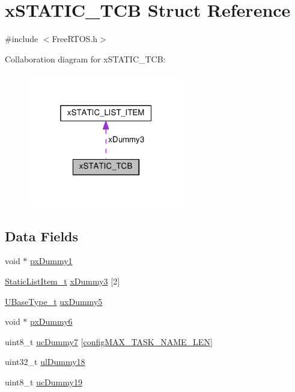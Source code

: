 \hypertarget{structxSTATIC__TCB}{}\section{x\+S\+T\+A\+T\+I\+C\+\_\+\+T\+CB Struct Reference}
\label{structxSTATIC__TCB}


{\ttfamily \#include $<$Free\+R\+T\+O\+S.\+h$>$}



Collaboration diagram for x\+S\+T\+A\+T\+I\+C\+\_\+\+T\+CB\+:\nopagebreak
\begin{figure}[H]
\begin{center}
\leavevmode
\includegraphics[width=193pt]{d1/d99/structxSTATIC__TCB__coll__graph}
\end{center}
\end{figure}
\subsection*{Data Fields}
\begin{DoxyCompactItemize}
\item 
void $\ast$ \hyperlink{structxSTATIC__TCB_a2f66b620fdeb13f8969f27e1bbb4d1d1}{px\+Dummy1}
\item 
\hyperlink{FreeRTOS_8h_a1d31bc0472385a87424518da484d9e09}{Static\+List\+Item\+\_\+t} \hyperlink{structxSTATIC__TCB_a7f182aa8f5003494f63d975dabcb3ec1}{x\+Dummy3} \mbox{[}2\mbox{]}
\item 
\hyperlink{portmacro_8h_a646f89d4298e4f5afd522202b11cb2e6}{U\+Base\+Type\+\_\+t} \hyperlink{structxSTATIC__TCB_ab950bb498901ef7291e49086e5a2efd0}{ux\+Dummy5}
\item 
void $\ast$ \hyperlink{structxSTATIC__TCB_a416495e152e5caef64994f72329c60b0}{px\+Dummy6}
\item 
uint8\+\_\+t \hyperlink{structxSTATIC__TCB_a308771ccd6723cad777695d84a0a2a30}{uc\+Dummy7} \mbox{[}\hyperlink{FreeRTOS_8h_ac388dc4041aab6997348828eb27fc1a8}{config\+M\+A\+X\+\_\+\+T\+A\+S\+K\+\_\+\+N\+A\+M\+E\+\_\+\+L\+EN}\mbox{]}
\item 
uint32\+\_\+t \hyperlink{structxSTATIC__TCB_ade6781276f913dcd592ee0f6cce76c7e}{ul\+Dummy18}
\item 
uint8\+\_\+t \hyperlink{structxSTATIC__TCB_aa98151056a161f180013ae36dae0d17b}{uc\+Dummy19}
\end{DoxyCompactItemize}



